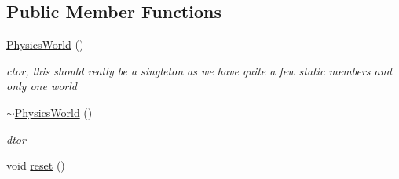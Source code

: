 \subsection*{Public Member Functions}
\begin{DoxyCompactItemize}
\item 
\hyperlink{classPhysicsWorld_ae7aea476bf3c5d337a4fa5c1ff02f5d4}{PhysicsWorld} ()
\begin{DoxyCompactList}\small\item\em ctor, this should really be a singleton as we have quite a few static members and only one world \item\end{DoxyCompactList}\item 
\hypertarget{classPhysicsWorld_abf1573b008b52b60a83a8f36cbdd51bc}{
\hyperlink{classPhysicsWorld_abf1573b008b52b60a83a8f36cbdd51bc}{$\sim$PhysicsWorld} ()}
\label{classPhysicsWorld_abf1573b008b52b60a83a8f36cbdd51bc}

\begin{DoxyCompactList}\small\item\em dtor \item\end{DoxyCompactList}\item 
\hypertarget{classPhysicsWorld_a2abd0187fc57fdef29022bc2f69980ea}{
void \hyperlink{classPhysicsWorld_a2abd0187fc57fdef29022bc2f69980ea}{reset} ()}
\label{classPhysicsWorld_a2abd0187fc57fdef29022bc2f69980ea}


\end{DoxyCompactItemize}
